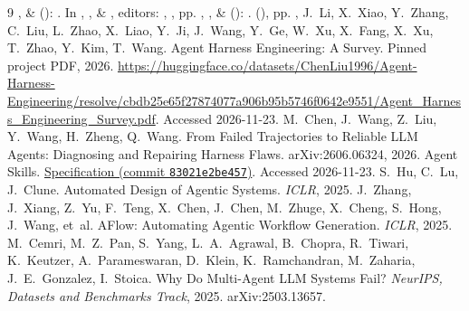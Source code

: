 \documentclass{article}
\theoremstyle{plain}
\theoremstyle{definition}
\begin{document}
\begin{thebibliography}{9}\small
,
   \&
  (): \emph{}.
\newblock In ,
  ,
   \&
  , editors: {\sl
  }, , pp.
  , %
  ,
   \&
  (): \emph{}.
  (), pp. ,
 J.~Li, X.~Xiao, Y.~Zhang, C.~Liu, L.~Zhao, X.~Liao, Y.~Ji, J.~Wang, Y.~Ge, W.~Xu, X.~Fang, X.~Xu, T.~Zhao, Y.~Kim, T.~Wang. Agent Harness Engineering: A Survey. Pinned project PDF, 2026. \url{https://huggingface.co/datasets/ChenLiu1996/Agent-Harness-Engineering/resolve/cbdb25e65f27874077a906b95b5746f0642e9551/Agent_Harness_Engineering_Survey.pdf}. Accessed 2026-11-23.
 M.~Chen, J.~Wang, Z.~Liu, Y.~Wang, H.~Zheng, Q.~Wang. From Failed Trajectories to Reliable LLM Agents: Diagnosing and Repairing Harness Flaws. arXiv:2606.06324, 2026.
 Agent Skills. \href{https://github.com/agentskills/agentskills/blob/83021e2be457a9b6679148719c1f6074f0ad975e/docs/specification.mdx}{Specification (commit \texttt{83021e2be457})}. Accessed 2026-11-23.
 S.~Hu, C.~Lu, J.~Clune. Automated Design of Agentic Systems. \emph{ICLR}, 2025.
 J.~Zhang, J.~Xiang, Z.~Yu, F.~Teng, X.~Chen, J.~Chen, M.~Zhuge, X.~Cheng, S.~Hong, J.~Wang, et~al. AFlow: Automating Agentic Workflow Generation. \emph{ICLR}, 2025.
 M.~Cemri, M.~Z.~Pan, S.~Yang, L.~A.~Agrawal, B.~Chopra, R.~Tiwari, K.~Keutzer, A.~Parameswaran, D.~Klein, K.~Ramchandran, M.~Zaharia, J.~E.~Gonzalez, I.~Stoica. Why Do Multi-Agent LLM Systems Fail? \emph{NeurIPS, Datasets and Benchmarks Track}, 2025. arXiv:2503.13657.

\end{thebibliography}
\end{document}
